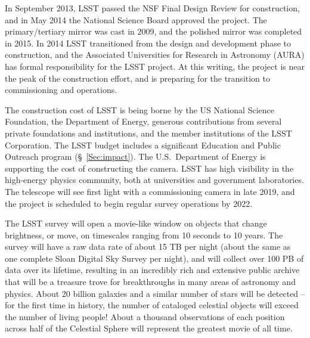 In September 2013, LSST passed the NSF Final Design Review for construction,
and in May 2014 the National Science Board approved the project.
The primary/tertiary mirror was cast in 2009, and the polished mirror
was completed in 2015.
In 2014 LSST transitioned from the design and development phase to
construction, and the Associated Universities for Research in
Astronomy (AURA) has formal responsibility for the LSST project.  At
this writing,  the project is near the peak of the construction
effort, and is preparing for the transition to
commissioning and operations.

The construction cost of LSST is being borne by the US National Science
Foundation, the Department of Energy, generous contributions from several
private foundations and institutions, and the member institutions of the
LSST Corporation. The LSST budget includes a significant Education and
Public Outreach program (\S~\ref{Sec:impact}).
The U.S.\ Department of Energy is supporting the cost of constructing the
camera. LSST has high visibility in the high-energy physics community,
both at universities and government laboratories. The telescope will
see first light with a commissioning camera in late 2019, and the
project is scheduled to begin regular survey operations by 2022.

The LSST survey will open a movie-like window on objects that
change brightness, or move, on timescales ranging from 10 seconds to 10 years.
The survey will have a raw data rate of about 15 TB per night (about the same as one
complete Sloan Digital Sky Survey per night), and will collect over 100 PB
of data over its lifetime, resulting in an incredibly rich and extensive
public archive that will be a treasure trove for breakthroughs in many areas
of astronomy and physics. About 20 billion galaxies and a similar number of stars
will be detected -- for the first time in history, the number of cataloged
celestial objects will exceed the number of living people! About a thousand
observations of each position across half of the Celestial Sphere will
represent the greatest movie of all time.


